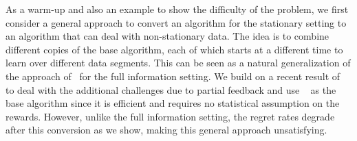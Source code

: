 

As a warm-up and also an example to show the difficulty of the problem, 
we first consider a general approach to convert an algorithm for the stationary setting
to an algorithm that can deal with non-stationary data.
The idea is to combine different copies of the base algorithm,
each of which starts at a different time to learn over different data segments.
This can be seen as a natural generalization of the approach of~\citet{HazanSe07} for the full information
setting. 
We build on a recent result of~\citet{AgarwalLuNeSc17} to deal with the additional challenges due to partial
feedback and use \bistro~\citep{SyrgkanisLuKrSc16} as the base algorithm
since it is efficient and requires no statistical assumption on the rewards. 
However, unlike the full information setting, the regret rates degrade after this conversion as we show,
making this general approach unsatisfying.

